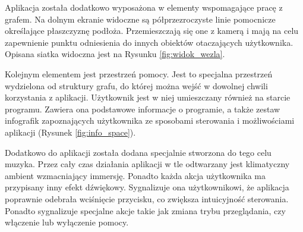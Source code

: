 
Aplikacja została dodatkowo wyposażona w elementy wspomagające pracę z grafem. Na dolnym ekranie widoczne są półprzezroczyste linie pomocnicze określające płaszczyznę podłoża. Przemieszczają się one z kamerą i mają na celu zapewnienie punktu odniesienia do innych obiektów otaczających użytkownika. Opisana siatka widoczna jest na Rysunku \ref{fig:widok_wezla}.

Kolejnym elementem jest przestrzeń pomocy. Jest to specjalna przestrzeń wydzielona od struktury grafu, do której można wejść w dowolnej chwili korzystania z aplikacji. Użytkownik jest w niej umieszczany również na starcie programu. Zawiera ona podstawowe informacje o programie, a także zestaw infografik zapoznających użytkownika ze sposobami sterowania i możliwościami aplikacji (Rysunek \ref{fig:info_space}).


Dodatkowo do aplikacji została dodana specjalnie stworzona do tego celu muzyka. Przez cały czas działania aplikacji w tle odtwarzany jest klimatyczny ambient wzmacniający immersję. Ponadto każda akcja użytkownika ma przypisany inny efekt dźwiękowy. Sygnalizuje ona użytkownikowi, że aplikacja poprawnie odebrała wciśnięcie przycisku, co zwiększa intuicyjność sterowania. Ponadto sygnalizuje specjalne akcje takie jak zmiana trybu przeglądania, czy włączenie lub wyłączenie pomocy.